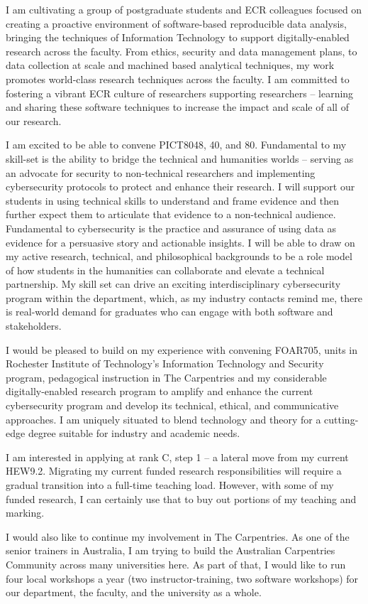 \documentclass[11pt, a4paper]{awesome-cv}
\begin{document}
\begin{cvletter}
I am cultivating a group of postgraduate students and ECR colleagues focused on creating a proactive environment of software-based reproducible data analysis, bringing the techniques of Information Technology to support digitally-enabled research across the faculty. From ethics, security and data management plans, to data collection at scale and machined based analytical techniques, my work promotes world-class research techniques across the faculty. I am committed to fostering a vibrant ECR culture of researchers supporting researchers -- learning and sharing these software techniques to increase the impact and scale of all of our research.

I am excited to be able to convene PICT8048, 40, and 80. Fundamental to my skill-set is the ability to bridge the technical and humanities worlds -- serving as an advocate for security to non-technical researchers and implementing cybersecurity protocols to protect and enhance their research. I will support our students in using technical skills to understand and frame evidence and then further expect them to articulate that evidence to a non-technical audience. Fundamental to cybersecurity is the practice and assurance of using data as evidence for a persuasive story and actionable insights. I will be able to draw on my active research, technical, and philosophical backgrounds to be a role model of how students in the humanities can collaborate and elevate a technical partnership. My skill set can drive an exciting interdisciplinary cybersecurity program within the department, which, as my industry contacts remind me, there is real-world demand for graduates who can engage with both software and stakeholders.

I would be pleased to build on my experience with convening FOAR705, units in Rochester Institute of Technology's Information Technology and Security program, pedagogical instruction in The Carpentries and my considerable digitally-enabled research program to amplify and enhance the current cybersecurity program and develop its technical, ethical, and communicative approaches. I am uniquely situated to blend technology and theory for a cutting-edge degree suitable for industry and academic needs. 



I am interested in applying at rank C, step 1 -- a lateral move from my current HEW9.2. Migrating my current funded research responsibilities will require a gradual transition into a full-time teaching load. However, with some of my funded research, I can certainly use that to buy out portions of my teaching and marking.

I would also like to continue my involvement in The Carpentries. As one of the senior trainers in Australia, I am trying to build the Australian Carpentries Community across many universities here. As part of that, I would like to run four local workshops a year (two instructor-training, two software workshops) for our department, the faculty, and the university as a whole. 




\end{cvletter}




\makeletterclosing
\end{document}
